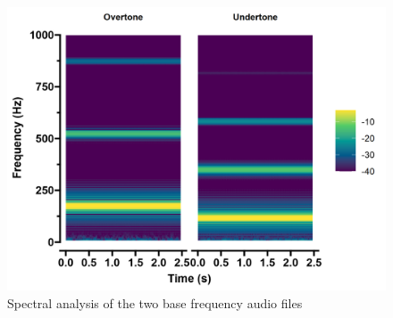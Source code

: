 \documentclass[10pt,a4paper,onecolumn]{article}
\begin{document}
\begin{figure}[h]

{\centering \includegraphics[width=1\linewidth]{figures/spec_tones} 

}

\caption{Spectral analysis of the two base frequency audio files}\label{fig:stimuli-spectra}
\end{figure}
\balance
\clearpage


\printbibliography[title=References,heading=bibintoc]
\end{document}
